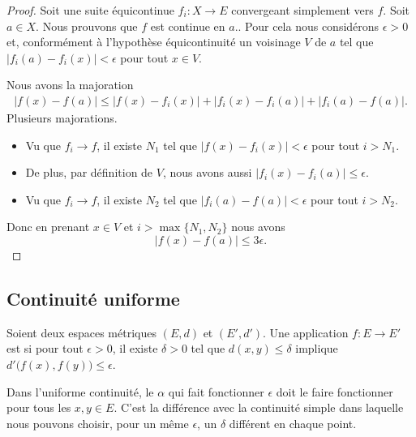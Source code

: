 \begin{proof}
	Soit une suite équicontinue \( f_i\colon X\to E\) convergeant simplement vers \( f\). Soit \( a\in X\). Nous prouvons que \( f\) est continue en \( a.\). Pour cela nous considérons \( \epsilon>0\) et, conformément à l'hypothèse équicontinuité un voisinage \( V\) de \( a\) tel que \( | f_i(a)-f_i(x) |<\epsilon\) pour tout \( x\in V\).

	Nous avons la majoration
	\begin{subequations}
		\begin{align}
			| f(x)-f(a) |\leq | f(x)-f_i(x) |+| f_i(x)-f_i(a) |+| f_i(a)-f(a) |.
		\end{align}
	\end{subequations}
	Plusieurs majorations.
	\begin{itemize}
		\item
		      Vu que \( f_i\to f\), il existe \( N_1\) tel que \( | f(x)-f_i(x) |<\epsilon\) pour tout \( i>N_1\).
		\item
		      De plus, par définition de \( V\), nous avons aussi \( | f_i(x)-f_i(a) |\leq \epsilon\).
		\item
		      Vu que \( f_i\to f\), il existe \( N_2\) tel que \( | f_i(a)-f(a) |<\epsilon\) pour tout \( i>N_2\).
	\end{itemize}
	Donc en prenant \( x\in V\) et \( i>\max\{ N_1,N_2 \}\) nous avons
	\begin{equation}
		| f(x)-f(a) |\leq 3\epsilon.
	\end{equation}
\end{proof}


\subsection{Continuité uniforme}

\begin{definition}\label{DEFooYIPXooQTscbG}
	Soient deux espaces métriques \( (E,d)\) et \( (E',d')\). Une application \( f\colon E\to E'\) est  si pour tout \( \epsilon>0\), il existe \( \delta>0\) tel que \( d(x,y)\leq \delta\) implique \( d'\big( f(x),f(y) \big)\leq \epsilon\).
\end{definition}
Dans l'uniforme continuité, le \( \alpha\) qui fait fonctionner \( \epsilon\) doit le faire fonctionner pour tous les \( x,y\in E\). C'est la différence avec la continuité simple dans laquelle nous pouvons choisir, pour un même \( \epsilon\), un \( \delta\) différent en chaque point.

